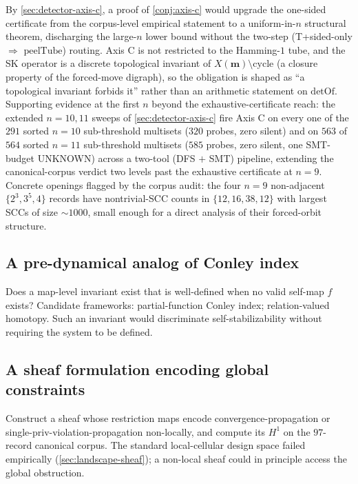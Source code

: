 \documentclass[11pt,a4paper]{article}
\theoremstyle{plain}
\theoremstyle{definition}
\newcommand{\detOf}{\mathrm{detOf}}
\newcommand{\peelTube}{\mathrm{peelTube}}
\begin{document}
By \cref{sec:detector-axis-c}, a proof of \cref{conj:axis-c} would
upgrade the one-sided certificate from the corpus-level empirical
statement to a uniform-in-$n$ structural theorem, discharging the
large-$n$ lower bound without the two-step
(T+sided-only $\Rightarrow$ $\peelTube$) routing.  Axis C is not
restricted to the Hamming-$1$ tube, and the SK operator is a
discrete topological invariant of $X(\mathbf{m}) \setminus
\mathrm{cycle}$ (a closure property of the forced-move digraph), so
the obligation is shaped as ``a topological invariant forbids it''
rather than an arithmetic statement on $\detOf$.  Supporting
evidence at the first $n$ beyond the exhaustive-certificate reach:
the extended $n = 10, 11$ sweeps of \cref{sec:detector-axis-c}
fire Axis C on every one of the $291$ sorted $n = 10$ sub-threshold
multisets ($320$ probes, zero silent) and on $563$ of $564$
sorted $n = 11$ sub-threshold multisets ($585$ probes, zero silent,
one SMT-budget UNKNOWN) across a two-tool (DFS $+$ SMT) pipeline,
extending the canonical-corpus verdict two levels past the
exhaustive certificate at $n = 9$.  Concrete openings flagged by the corpus audit: the four
$n = 9$ non-adjacent $\{2^3, 3^5, 4\}$ records have nontrivial-SCC
counts in $\{12, 16, 38, 12\}$ with largest SCCs of size
$\sim 1000$, small enough for a direct analysis of their
forced-orbit structure.

\subsection{A pre-dynamical analog of Conley index}\label{sec:open-conley}

Does a map-level invariant exist that is well-defined when no valid
self-map $f$ exists?  Candidate frameworks: partial-function Conley
index; relation-valued homotopy.  Such an invariant would discriminate
self-stabilizability without requiring the system to be defined.

\subsection{A sheaf formulation encoding global constraints}\label{sec:open-sheaf}

Construct a sheaf whose restriction maps encode
convergence-propagation or single-priv-violation-propagation
non-locally, and compute its $H^1$ on the $97$-record canonical
corpus.  The standard local-cellular design space failed
empirically (\cref{sec:landscape-sheaf}); a non-local sheaf could
in principle access the global obstruction.
\end{document}
